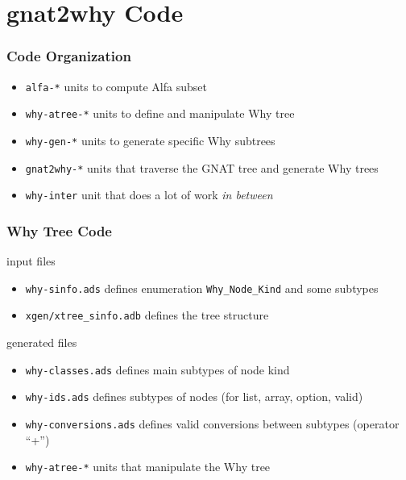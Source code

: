 \documentclass{beamer}
\newcommand{\vs}{\vspace{0.5cm}}
\newenvironment{specialframe}{%
  \begin{frame}[fragile,environment=specialframe]}{\end{frame}}
\begin{document}
\section{gnat2why Code}

\begin{specialframe}\frametitle{Code Organization}
   \begin{itemize}
      \item \verb|alfa-*|       units to compute Alfa subset
      \item \verb|why-atree-*|  units to define and manipulate Why tree
      \item \verb|why-gen-*|    units to generate specific Why subtrees
      \item \verb|gnat2why-*|   units that traverse the GNAT tree and generate
         Why trees
      \item \verb|why-inter|    unit that does a lot of work \emph{in between}
   \end{itemize}
\end{specialframe}

\begin{specialframe}\frametitle{Why Tree Code}
  input files
  \begin{itemize}
  \item \verb|why-sinfo.ads|  defines enumeration \verb|Why_Node_Kind| and some subtypes
  \item \verb|xgen/xtree_sinfo.adb| defines the tree structure
  \end{itemize}

\vs
  generated files
  \begin{itemize}
  \item \verb|why-classes.ads| defines main subtypes of node kind
  \item \verb|why-ids.ads|    defines subtypes of nodes (for list, array, option, valid)
  \item \verb|why-conversions.ads|    defines valid conversions between subtypes (operator ``+'')
  \item \verb|why-atree-*|   units that manipulate the Why tree
   \end{itemize}
\end{specialframe}
\end{document}
